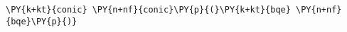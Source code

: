\begin{Verbatim}[commandchars=\\\{\}]
    \PY{k+kt}{conic} \PY{n+nf}{conic}\PY{p}{(}\PY{k+kt}{bqe} \PY{n+nf}{bqe}\PY{p}{)}
\end{Verbatim}

